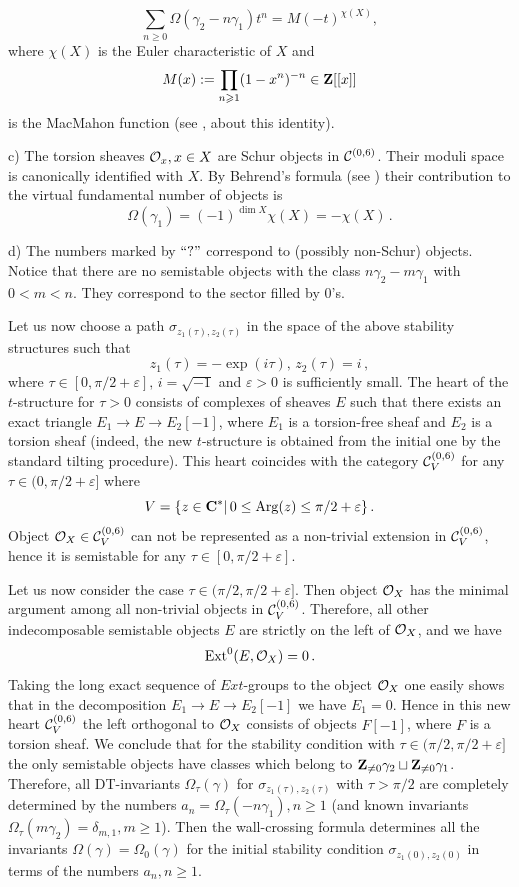 \documentclass[12pt]{article}
\begin{document}
$$ \sum_{n\geqslant 0}\Omega(\gamma_2-n\gamma_1)t^n=M(-t)^{\chi(X)},$$
where $\chi(X)$ is the Euler characteristic of $X$ and $$M(x):=\prod_{n\geqslant 1}(1-x^n)^{-n}\in {\bf Z}[[x]] 
$$ is the MacMahon function (see \cite{MaNOP}, \cite{BF} about this identity).

c) The torsion sheaves ${\cal O}_x, x\in X$ are Schur objects in ${\mathcal C}^{(0,6)}$. Their moduli space is canonically identified with $X$. By Behrend's formula (see \cite{B}) their contribution to the virtual fundamental number of objects is 
$$\Omega(\gamma_1)=(-1)^{\dim X}\chi(X)=-\chi(X)\,.$$

d) The numbers marked by $``?"$ correspond to (possibly non-Schur) objects. Notice that there are no semistable objects with the class $n\gamma_2-m\gamma_1$ with $0<m<n$. They correspond to the sector filled by $0$'s.


Let us now choose a path $\sigma_{z_1(\tau),z_2(\tau)}$ in the space of the above stability structures such that 
$$ z_1(\tau)=-\exp(i\tau),\,z_2(\tau)=i\,,$$ where $\tau\in [0,\pi/2+\varepsilon],\, i=\sqrt{-1}$ and $\varepsilon>0$ is sufficiently small. The heart of the $t$-structure for $\tau>0$ consists of complexes of sheaves $E$ such that there exists an exact triangle $E_1\to E\to E_2[-1]$, where $E_1$ is a torsion-free sheaf and $E_2$ is a torsion sheaf (indeed, the new $t$-structure is obtained from the initial one by the standard tilting procedure). 
This heart coincides with the category ${\mathcal C}^{(0,6)}_V$ for any $\tau \in (0,\pi/2+\varepsilon]$ where 
$$V=\{z\in {\bf C}^\ast|\,0\le \operatorname{Arg}(z)\le \pi/2+\varepsilon\}\,.$$
Object ${\cal O}_X\in {\mathcal C}^{(0,6)}_V$ can not be represented as a non-trivial extension in ${\mathcal C}^{(0,6)}_V$, hence it is semistable for
 any $\tau \in [0,\pi/2+\varepsilon]$. 

Let us now consider the case $\tau \in (\pi/2,\pi/2+\varepsilon]$. Then  object ${\cal O}_X$ has the minimal argument among all non-trivial
objects in ${\mathcal C}^{(0,6)}_V$. Therefore, all other indecomposable semistable objects $E$ are strictly on the left of ${\cal O}_X$, and we have
 $$\operatorname{Ext}^0(E, {\cal O}_X)=0\,.$$
Taking the long exact sequence of $Ext$-groups to the object ${\cal O}_X$ one easily shows that 
in the decomposition $E_1\to E\to E_2[-1]$ we have
$E_1=0$.  Hence in this new heart ${\mathcal C}^{(0,6)}_V$  the left orthogonal to  ${\cal O}_X$ 
consists of objects $F[-1]$, where $F$ is a torsion sheaf.
We conclude that for the stability condition with $\tau \in (\pi/2,\pi/2+\varepsilon]$ the only semistable objects have classes which belong to
${\bf Z}_{\ne 0}\gamma_2\sqcup {\bf Z}_{\ne 0}\gamma_1$. Therefore, all DT-invariants $\Omega_\tau (\gamma)$ for $\sigma_{z_1({\tau}),z_2(\tau)}$ with $\tau 
>\pi/2$ are completely determined by the numbers $a_n=\Omega_{\tau}(-n\gamma_1), n\geqslant 1$
(and known invariants $\Omega_{\tau}(m\gamma_2)=\delta_{m,1}, m\geqslant 1$). Then the wall-crossing formula determines all the invariants 
$\Omega(\gamma)=\Omega_0(\gamma)$ for the initial stability condition $\sigma_{z_1(0),z_2(0)}$ in terms of the numbers $a_n, n\geqslant 1$.
\end{document}

